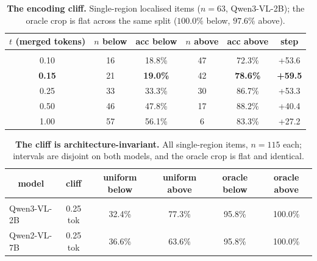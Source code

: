 \begin{table}[t]
\caption{\textbf{The encoding cliff.} Single-region localised items ($n{=}63$, Qwen3-VL-2B); the
oracle crop is flat across the same split ($100.0\%$ below, $97.6\%$ above).}
\label{tab:cliff}
\begin{center}
\small
\begin{tabular}{cccccc}
\multicolumn{1}{c}{\bf $t$ (merged tokens)}  &\multicolumn{1}{c}{\bf $n$ below} &\multicolumn{1}{c}{\bf acc below} &\multicolumn{1}{c}{\bf $n$ above} &\multicolumn{1}{c}{\bf acc above} &\multicolumn{1}{c}{\bf step}
\\ \hline \\
0.10 & 16 & 18.8\% & 47 & 72.3\% & +53.6\\
\textbf{0.15} & 21 & \textbf{19.0\%} & 42 & \textbf{78.6\%} & \textbf{+59.5}\\
0.25 & 33 & 33.3\% & 30 & 86.7\% & +53.3\\
0.50 & 46 & 47.8\% & 17 & 88.2\% & +40.4\\
1.00 & 57 & 56.1\% & 6 & 83.3\% & +27.2\\
\end{tabular}
\end{center}
\end{table}

\begin{table}[t]
\caption{\textbf{The cliff is architecture-invariant.} All single-region items, $n{=}115$ each;
intervals are disjoint on both models, and the oracle crop is flat and identical.}
\label{tab:cliff2}
\begin{center}
\small
\begin{tabular}{lccccc}
\multicolumn{1}{c}{\bf model}  &\multicolumn{1}{c}{\bf cliff} &\multicolumn{1}{c}{\bf uniform below} &\multicolumn{1}{c}{\bf uniform above} &\multicolumn{1}{c}{\bf oracle below} &\multicolumn{1}{c}{\bf oracle above}
\\ \hline \\
Qwen3-VL-2B & 0.25 tok & 32.4\% & 77.3\% & 95.8\% & 100.0\%\\
Qwen2-VL-7B & 0.25 tok & 36.6\% & 63.6\% & 95.8\% & 100.0\%\\
\end{tabular}
\end{center}
\end{table}

